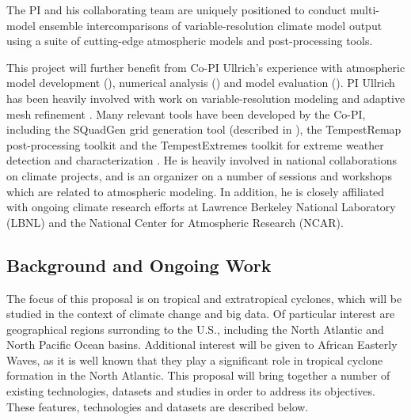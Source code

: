 \documentclass[11pt]{article}
\begin{document}
The PI and his collaborating team are uniquely positioned to conduct multi-model ensemble intercomparisons of variable-resolution climate model output using a suite of cutting-edge atmospheric models and post-processing tools.

This project will further benefit from Co-PI Ullrich's experience with atmospheric model development  (\cite{ullrich2010high, PHLPAURDN2011SPRINGER, ullrich2012operator, ullrich2012mcore, ullrich2014fluxform, guba2014viscosity, ullrich2014understanding, ullrich2014global}), numerical analysis (\cite{ullrich2011analysis, ullrich2012considerations}) and model evaluation (\cite{DCMIP2012TESTCASES, ullrich2014proposed, kent2013dynamical, ullrich2014baroclinic}).  PI Ullrich has been heavily involved with work on variable-resolution modeling \citep{zarzycki2014aquaplanet} and adaptive mesh refinement  \citep{collins2013nonhydrostatic, mccorquodale2014adaptive}. Many relevant tools have been developed by the Co-PI, including the SQuadGen grid generation tool (described in \cite{guba2014viscosity}), the TempestRemap post-processing toolkit \citep{ullrich2015remapping} and the TempestExtremes toolkit for extreme weather detection and characterization \citep{ullrich2015extremes}. He is heavily involved in national collaborations on climate projects, and is an organizer on a number of sessions and workshops which are related to atmospheric modeling. In addition, he is closely affiliated with ongoing climate research efforts at Lawrence Berkeley National Laboratory (LBNL) and the National Center for Atmospheric Research (NCAR).

\subsection{Background and Ongoing Work} \label{sec:BackgroundOngoingWork}

The focus of this proposal is on tropical and extratropical cyclones, which will be studied in the context of climate change and big data.  Of particular interest are geographical regions surronding to the U.S., including the North Atlantic and North Pacific Ocean basins. Additional interest will be given to African Easterly Waves, as it is well known that they play a significant role in tropical cyclone formation in the North Atlantic. This proposal will bring together a number of existing technologies, datasets and studies in order to address its objectives.  These features, technologies and datasets are described below.
\end{document}
